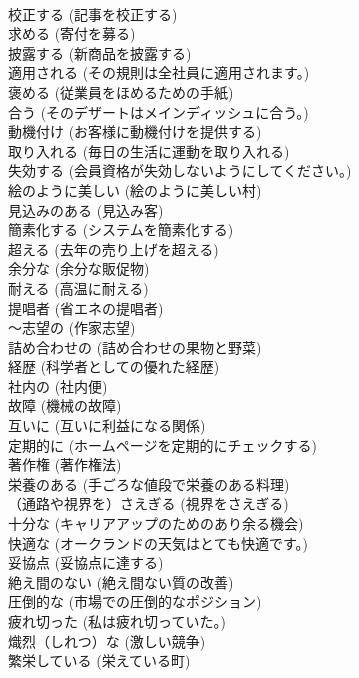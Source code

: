 \documentclass[8pt]{extreport}
\begin{document}
\begin{CJK}{UTF8}{min}
\\	校正する	(記事を校正する)		
\\	求める	(寄付を募る)		
\\	披露する	(新商品を披露する)		
\\	適用される	(その規則は全社員に適用されます。)		
\\	褒める	(従業員をほめるための手紙)		
\\	合う	(そのデザートはメインディッシュに合う。)		
\\	動機付け	(お客様に動機付けを提供する)		
\\	取り入れる	(毎日の生活に運動を取り入れる)		
\\	失効する	(会員資格が失効しないようにしてください。)		
\\	絵のように美しい	(絵のように美しい村)		
\\	見込みのある	(見込み客)		
\\	簡素化する	(システムを簡素化する)		
\\	超える	(去年の売り上げを超える)		
\\	余分な	(余分な販促物)		
\\	耐える	(高温に耐える)		
\\	提唱者	(省エネの提唱者)		
\\	～志望の	(作家志望)		
\\	詰め合わせの	(詰め合わせの果物と野菜)		
\\	経歴	(科学者としての優れた経歴)		
\\	社内の	(社内便)		
\\	故障	(機械の故障)		
\\	互いに	(互いに利益になる関係)		
\\	定期的に	(ホームページを定期的にチェックする)		
\\	著作権	(著作権法)		
\\	栄養のある	(手ごろな値段で栄養のある料理)		
\\	（通路や視界を）さえぎる	(視界をさえぎる)		
\\	十分な	(キャリアアップのためのあり余る機会)		
\\	快適な	(オークランドの天気はとても快適です。)		
\\	妥協点	(妥協点に達する)		
\\	絶え間のない	(絶え間ない質の改善)		
\\	圧倒的な	(市場での圧倒的なポジション)		
\\	疲れ切った	(私は疲れ切っていた。)		
\\	熾烈（しれつ）な	(激しい競争)		
\\	繁栄している	(栄えている町)		

\end{CJK}
\end{document}
